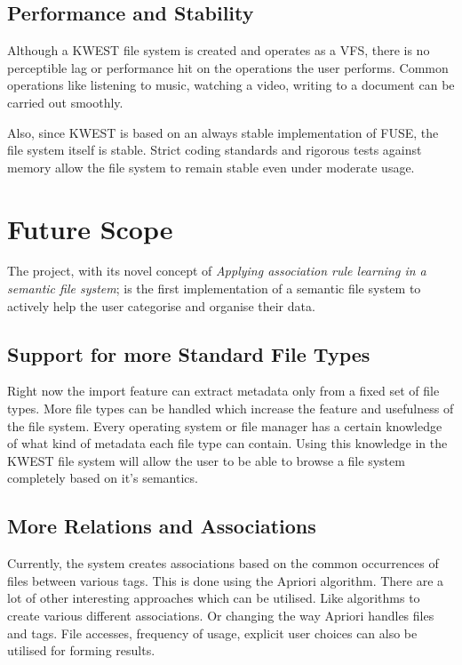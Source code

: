 \subsection*{Performance and Stability}
Although a KWEST file system is created and operates as a VFS, there is no perceptible lag or performance hit on the operations the user performs. Common operations like listening to music, watching a video, writing to a document can be carried out smoothly.

Also, since KWEST is based on an always stable implementation of FUSE, the file system itself is stable. Strict coding standards and rigorous tests against memory allow the file system to remain stable even under moderate usage.


\section{Future Scope}

The project, with its novel concept of \textit{Applying association rule learning in a semantic file system}; is the first implementation of a semantic file system to actively help the user categorise and organise their data.

\subsection*{Support for more Standard File Types}
Right now the import feature can extract metadata only from a fixed set of file types. More file types can be handled which increase the feature and usefulness of the file system. Every operating system or file manager has a certain knowledge of what kind of metadata each file type can contain. Using this knowledge in the KWEST file system will allow the user to be able to browse a file system completely based on it's semantics.

\subsection*{More Relations and Associations}
Currently, the system creates associations based on the common occurrences of files between various tags. This is done using the Apriori algorithm. There are a lot of other interesting approaches which can be utilised. Like algorithms to create various different associations. Or changing the way Apriori handles files and tags. File accesses, frequency of usage, explicit user choices can also be utilised for forming results.

